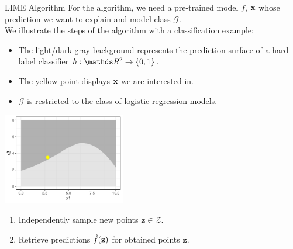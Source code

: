 \documentclass[11pt,compress,t,notes=noshow, xcolor=table]{beamer}
\newcommand{\Gspace}{\mathcal{G}}
\newcommand{\zv}{\mathbf{z}}
\newcommand{\Zspace}{\mathcal{Z}}
\begin{document}
\begin{vbframe}{LIME Algorithm}
		For the algorithm, we need a pre-trained model $f$, $\xv$ whose prediction we want to explain and model class $\Gspace$.\\ \vspace{0.5cm}
		We illustrate the steps of the algorithm with a classification example: 
		\begin{itemize}
			\item The light/dark gray background represents the prediction surface of a hard label classifier $h: \R^2 \to \{0, 1\}$.
			\item The yellow point displays $\xv$ we are interested in. 
			\item $\Gspace$ is restricted to the class of logistic regression models. 
		\end{itemize}
		\begin{center}
			\includegraphics[width=0.4\textwidth]{figure/lime2}
		\end{center}
	
		\begin{enumerate}
		\framebreak 
		\item Independently sample new points $\zv \in \Zspace$. 
		\item Retrieve predictions $\fh(\zv)$ for obtained points $\zv$. \\[0.2cm]
		

\end{enumerate}
\end{vbframe}
\end{document}
